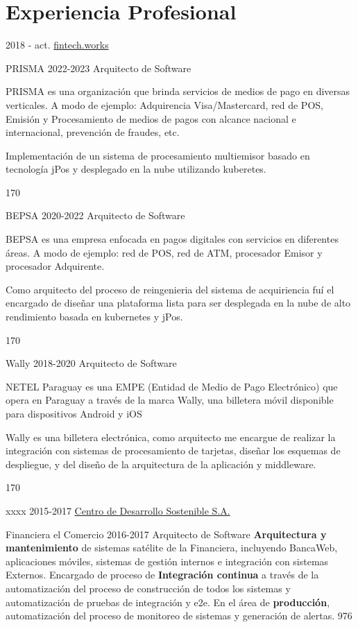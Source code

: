 \documentclass[]{friggeri-cv}
\begin{document}
\section{Experiencia Profesional}
\begin{entrylist}
\entry
    {2018 - act.}
    {\href{https://fintech.works}{fintech.works}}
    {}
    { \proyecto
        {PRISMA}
        {2022-2023}
        {}
        {Arquitecto de Software}
        {
            PRISMA es una organización que brinda servicios de medios de pago en diversas verticales. 
            A modo de ejemplo: Adquirencia Visa/Mastercard, red de POS, Emisión y Procesamiento de 
            medios de pagos con alcance nacional e internacional, prevención de fraudes, etc. 

            Implementación de un sistema de procesamiento multiemisor basado en tecnología jPos y 
            desplegado en la nube utilizando kuberetes.
        } 
        {170}
 
    \proyecto
        {BEPSA}
        {2020-2022}
        {}
        {Arquitecto de Software}
        {
            BEPSA es una empresa enfocada en pagos digitales con servicios en diferentes áreas. A modo 
            de ejemplo: red de POS, red de ATM, procesador Emisor y procesador Adquirente.

            Como arquitecto del proceso de reingenieria del sistema de acquiriencia fuí el encargado
            de diseñar una plataforma lista para ser desplegada en la nube de alto rendimiento basada
            en kubernetes y jPos.
        } 
        {170}

    \proyecto
        {Wally}
        {2018-2020}
        {}
        {Arquitecto de Software}
        {
            NETEL Paraguay es una EMPE (Entidad de Medio de Pago Electrónico) que opera en Paraguay 
            a través de la marca Wally, una billetera móvil disponible para dispositivos Android y iOS

            Wally es una billetera electrónica, como arquitecto me encargue de realizar
            la integración con sistemas de procesamiento de tarjetas, diseñar los esquemas de 
            despliegue, y del diseño de la arquitectura de la aplicación y middleware.} 
        {170}

    }
    {xxxx}
\entry
    {2015-2017}
    {\href{https://www.cds.com.py}{Centro de Desarrollo Sostenible S.A.}}
    {}
    {\proyecto
        {Financiera el Comercio}
        {2016-2017}
        {}
        {Arquitecto de Software}
        {
        \textbf{Arquitectura y mantenimiento} de sistemas satélite de la Financiera, incluyendo BancaWeb, aplicaciones móviles, sistemas de gestión internos e integración con sistemas Externos. Encargado de proceso de 
        \textbf{Integración continua} a través de la automatización del proceso de construcción de todos los sistemas y automatización de pruebas de integración y e2e. En el área de \textbf{producción}, automatización del proceso de monitoreo de sistemas y generación de alertas.
        } 
        {976}
    
}
\end{entrylist}
\end{document}
